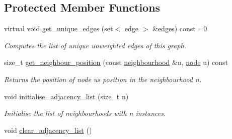 \subsection*{Protected Member Functions}
\begin{DoxyCompactItemize}
\item 
virtual void \hyperlink{classlgraph_1_1utils_1_1uxgraph_a042795f5d307b07396da89d50734234a}{get\+\_\+unique\+\_\+edges} (set$<$ \hyperlink{namespacelgraph_1_1utils_a6510284ce1b1ae5dc97ce5d2de426e10}{edge} $>$ \&\hyperlink{classlgraph_1_1utils_1_1uxgraph_ade877f3a9cf71d844cfe7b6c4f8aae10}{edges}) const =0
\begin{DoxyCompactList}\small\item\em Computes the list of unique unweighted edges of this graph. \end{DoxyCompactList}\item 
size\+\_\+t \hyperlink{classlgraph_1_1utils_1_1xxgraph_aac7ef2134cad9529869f1334de7892d9}{get\+\_\+neighbour\+\_\+position} (const \hyperlink{namespacelgraph_1_1utils_a0f2ef47028a466d26841709e705390ac}{neighbourhood} \&n, \hyperlink{namespacelgraph_1_1utils_a7bd66ede3805ef121bc2835bd48de0cf}{node} u) const 
\begin{DoxyCompactList}\small\item\em Returns the position of node {\itshape u\textquotesingle{}s} position in the neighbourhood {\itshape n}. \end{DoxyCompactList}\item 
void \hyperlink{classlgraph_1_1utils_1_1xxgraph_a2201aaff5e9ffa29a9b3abfde705dd46}{initialise\+\_\+adjacency\+\_\+list} (size\+\_\+t n)\hypertarget{classlgraph_1_1utils_1_1xxgraph_a2201aaff5e9ffa29a9b3abfde705dd46}{}\label{classlgraph_1_1utils_1_1xxgraph_a2201aaff5e9ffa29a9b3abfde705dd46}

\begin{DoxyCompactList}\small\item\em Initialise the list of neighbourhoods with {\itshape n} instances. \end{DoxyCompactList}\item 
void \hyperlink{classlgraph_1_1utils_1_1xxgraph_a6523402d0ec66918b95de23d2bee38fc}{clear\+\_\+adjacency\+\_\+list} ()\hypertarget{classlgraph_1_1utils_1_1xxgraph_a6523402d0ec66918b95de23d2bee38fc}{}\label{classlgraph_1_1utils_1_1xxgraph_a6523402d0ec66918b95de23d2bee38fc}


\end{DoxyCompactItemize}
